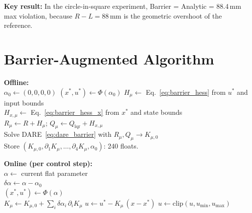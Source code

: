 \documentclass[11pt]{article}
\newcommand{\clip}{\mathrm{clip}}
\begin{document}
\textbf{Key result:}
In the circle-in-square experiment,
Barrier = Analytic = 88.4\,mm max violation,
because $R - L = 88$\,mm is the geometric overshoot
of the reference.

\section{Barrier-Augmented Algorithm}\label{sec:barrier-alg}

\begin{algorithm}[H]
\SetAlgoLined
\caption{Barrier-Augmented Template MPC}\label{alg:barrier}

\medskip
\textbf{Offline:}\\
$\alpha_0 \gets (0,0,0,0)$ 
$(x^*, u^*) \gets \Phi(\alpha_0)$
$H_\mu \gets$ Eq.~\eqref{eq:barrier_hess}
from $u^*$ and input bounds\\
$H_{x,\mu} \gets$ Eq.~\eqref{eq:barrier_hess_x}
from $x^*$ and state bounds\\
$R_\mu \gets R + H_\mu$;\quad
$Q_\mu \gets Q_{\mathrm{lqr}} + H_{x,\mu}$\\
Solve DARE~\eqref{eq:dare_barrier}
with $R_\mu, Q_\mu \to K_{\mu,0}$\\

Store $(K_{\mu,0}, \partial_1 K_\mu, \ldots, \partial_4 K_\mu, \alpha_0)$:
240 floats.

\medskip
\textbf{Online (per control step):}\\
$\alpha \gets$ current flat parameter\\
$\delta\alpha \gets \alpha - \alpha_0$\\
$(x^*, u^*) \gets \Phi(\alpha)$\\
$K_\mu \gets K_{\mu,0}
  + \sum_i \delta\alpha_i \, \partial_i K_\mu$
$u \gets u^* - K_\mu \, (x - x^*)$
$u \gets \clip(u, u_{\min}, u_{\max})$
\end{algorithm}
\end{document}
